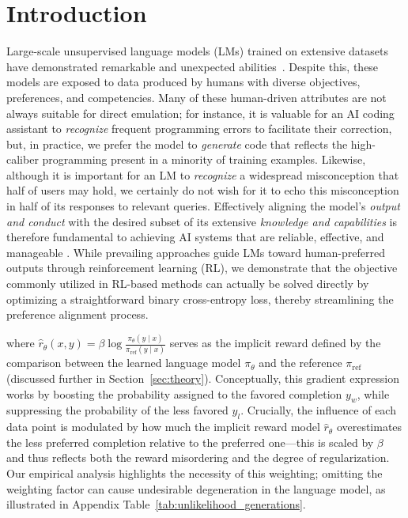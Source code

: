 \section{Introduction}
Large-scale unsupervised language models (LMs) trained on extensive datasets have demonstrated remarkable and unexpected abilities~\citep{chowdhery2022palm, brown2020language, touvron2023llama,bubeck2023sparks}. Despite this, these models are exposed to data produced by humans with diverse objectives, preferences, and competencies. Many of these human-driven attributes are not always suitable for direct emulation; for instance, it is valuable for an AI coding assistant to \textit{recognize} frequent programming errors to facilitate their correction, but, in practice, we prefer the model to \emph{generate} code that reflects the high-caliber programming present in a minority of training examples. Likewise, although it is important for an LM to \textit{recognize} a widespread misconception that half of users may hold, we certainly do not wish for it to echo this misconception in half of its responses to relevant queries. Effectively aligning the model’s \emph{output and conduct} with the desired subset of its extensive \textit{knowledge and capabilities} is therefore fundamental to achieving AI systems that are reliable, effective, and manageable \citep{ouyang2022training}. While prevailing approaches guide LMs toward human-preferred outputs through reinforcement learning (RL), we demonstrate that the objective commonly utilized in RL-based methods can actually be solved directly by optimizing a straightforward binary cross-entropy loss, thereby streamlining the preference alignment process.

where $\hat{r}_\theta(x, y) = \beta \log \frac{\pi_\theta(y \mid x)}{\pi_\text{ref}(y \mid x)}$ serves as the implicit reward defined by the comparison between the learned language model $\pi_\theta$ and the reference $\pi_\text{ref}$ (discussed further in Section~\ref{sec:theory}). Conceptually, this gradient expression works by boosting the probability assigned to the favored completion $y_w$, while suppressing the probability of the less favored $y_l$. Crucially, the influence of each data point is modulated by how much the implicit reward model $\hat{r}_\theta$ overestimates the less preferred completion relative to the preferred one—this is scaled by $\beta$ and thus reflects both the reward misordering and the degree of regularization. Our empirical analysis highlights the necessity of this weighting; omitting the weighting factor can cause undesirable degeneration in the language model, as illustrated in Appendix Table~\ref{tab:unlikelihood_generations}.


